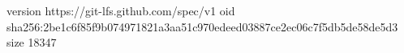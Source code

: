 version https://git-lfs.github.com/spec/v1
oid sha256:2be1c6f85f9b074971821a3aa51c970edeed03887ce2ec06c7f5db5de58de5d3
size 18347
